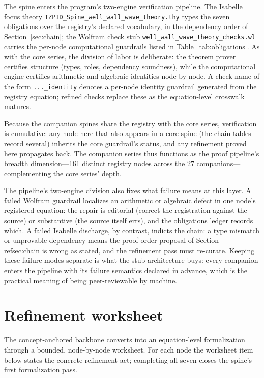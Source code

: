 \documentclass[11pt]{article}
\theoremstyle{remark}
\begin{document}
The spine enters the program's two-engine verification pipeline. The Isabelle focus theory \texttt{TZPID\_Spine\_well\_wall\_wave\_theory.thy} types the seven obligations over the registry's declared vocabulary, in the dependency order of Section~\ref{sec:chain}; the Wolfram check stub \texttt{well\_wall\_wave\_theory\_checks.wl} carries the per-node computational guardrails listed in Table~\ref{tab:obligations}. As with the core series, the division of labor is deliberate: the theorem prover certifies structure (types, roles, dependency soundness), while the computational engine certifies arithmetic and algebraic identities node by node. A check name of the form \texttt{...\_identity} denotes a per-node identity guardrail generated from the registry equation; refined checks replace these as the equation-level crosswalk matures.

Because the companion spines share the registry with the core series, verification is cumulative: any node here that also appears in a core spine (the chain tables record several) inherits the core guardrail's status, and any refinement proved here propagates back. The companion series thus functions as the proof pipeline's breadth dimension---161 distinct registry nodes across the 27 companions---complementing the core series' depth.

The pipeline's two-engine division also fixes what failure means at this layer. A failed Wolfram guardrail localizes an arithmetic or algebraic defect in one node's registered equation: the repair is editorial (correct the registration against the source) or substantive (the source itself errs), and the obligations ledger records which. A failed Isabelle discharge, by contrast, indicts the chain: a type mismatch or unprovable dependency means the proof-order proposal of Section~\\ref{sec:chain} is wrong as stated, and the refinement pass must re-curate. Keeping these failure modes separate is what the stub architecture buys: every companion enters the pipeline with its failure semantics declared in advance, which is the practical meaning of being peer-reviewable by machine.

\section{Refinement worksheet}
\label{sec:worksheet}

The concept-anchored backbone converts into an equation-level formalization through a bounded, node-by-node worksheet. For each node the worksheet item below states the concrete refinement act; completing all seven closes the spine's first formalization pass.
\end{document}
